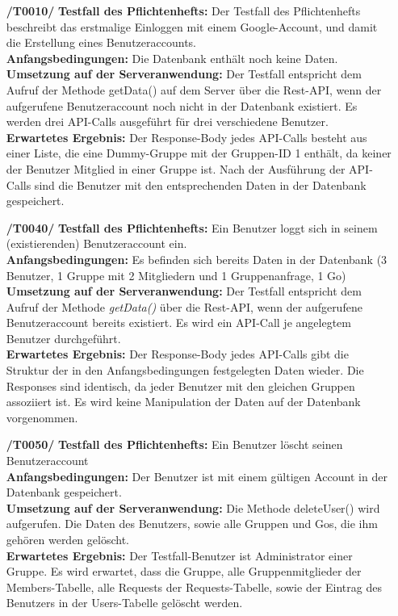 \documentclass[11pt,a4paper]{scrartcl}
\begin{document}
\begin{enumerate}
	\item[\textbf{/T0010/}]
	\textbf{Testfall des Pflichtenhefts: }Der Testfall des Pflichtenhefts beschreibt das erstmalige Einloggen mit einem Google-Account, und damit die Erstellung eines Benutzeraccounts.\\
	\textbf{Anfangsbedingungen: }Die Datenbank enthält noch keine Daten.\\
	\textbf{Umsetzung auf der Serveranwendung: }Der Testfall entspricht dem Aufruf der Methode getData() auf dem Server über die Rest-API, wenn der aufgerufene Benutzeraccount noch nicht in der Datenbank existiert. Es werden drei API-Calls ausgeführt für drei verschiedene Benutzer.\\
	\textbf{Erwartetes Ergebnis: } Der Response-Body jedes API-Calls besteht aus einer Liste, die eine Dummy-Gruppe mit der Gruppen-ID 1 enthält, da keiner der Benutzer Mitglied in einer Gruppe ist. Nach der Ausführung der API-Calls sind die Benutzer mit den entsprechenden Daten in der Datenbank gespeichert.
	
	\item[\textbf{/T0040/}]
	\textbf{Testfall des Pflichtenhefts: }Ein Benutzer loggt sich in seinem (existierenden) Benutzeraccount ein.\\
	\textbf{Anfangsbedingungen: }Es befinden sich bereits Daten in der Datenbank (3 Benutzer, 1 Gruppe mit 2 Mitgliedern und 1 Gruppenanfrage, 1 Go)\\
	\textbf{Umsetzung auf der Serveranwendung: }Der Testfall entspricht dem Aufruf der Methode \textit{getData()} über die Rest-API, wenn der aufgerufene Benutzeraccount bereits existiert. Es wird ein API-Call je angelegtem Benutzer durchgeführt.\\
	\textbf{Erwartetes Ergebnis: }Der Response-Body jedes API-Calls gibt die Struktur der in den Anfangsbedingungen festgelegten Daten wieder. Die Responses sind identisch, da jeder Benutzer mit den gleichen Gruppen assoziiert ist. Es wird keine Manipulation der Daten auf der Datenbank vorgenommen.
	
	\item[\textbf{/T0050/}]
	\textbf{Testfall des Pflichtenhefts: }Ein Benutzer löscht seinen Benutzeraccount\\
	\textbf{Anfangsbedingungen: }Der Benutzer ist mit einem gültigen Account in der Datenbank gespeichert.\\
	\textbf{Umsetzung auf der Serveranwendung: }Die Methode deleteUser() wird aufgerufen. Die Daten des Benutzers, sowie alle Gruppen und Gos, die ihm gehören werden gelöscht.\\
	\textbf{Erwartetes Ergebnis: }Der Testfall-Benutzer ist Administrator einer Gruppe. Es wird erwartet, dass die Gruppe, alle Gruppenmitglieder der Members-Tabelle, alle Requests der Requests-Tabelle, sowie der Eintrag des Benutzers in der Users-Tabelle gelöscht werden.
	

\end{enumerate}
\end{document}
